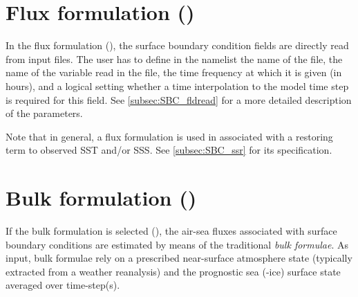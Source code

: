 \documentclass[../main/NEMO_manual]{subfiles}
\begin{document}
\section[Flux formulation (\textit{sbcflx.F90})]{Flux formulation (\protect{})}
\label{sec:SBC_flx}


\begin{listing}
  \caption{}
  \label{lst:namsbc_flx}
\end{listing}

In the flux formulation (),
the surface boundary condition fields are directly read from input files.
The user has to define in the namelist  the name of the file,
the name of the variable read in the file, the time frequency at which it is given (in hours),
and a logical setting whether a time interpolation to the model time step is required for this field.
See \autoref{subsec:SBC_fldread} for a more detailed description of the parameters.

Note that in general, a flux formulation is used in associated with a restoring term to observed SST and/or SSS.
See \autoref{subsec:SBC_ssr} for its specification.







\pagebreak
\newpage
\section[Bulk formulation (\textit{sbcblk.F90})]{Bulk formulation (\protect{})}
\label{sec:SBC_blk}


\begin{listing}
  \caption{}
  \label{lst:namsbc_blk}
\end{listing}

If the bulk formulation is selected (), the air-sea
fluxes associated with surface boundary conditions are estimated by means of the
traditional \emph{bulk formulae}. As input, bulk formulae rely on a prescribed
near-surface atmosphere state (typically extracted from a weather reanalysis)
and the prognostic sea (-ice) surface state averaged over 
time-step(s).
\end{document}
